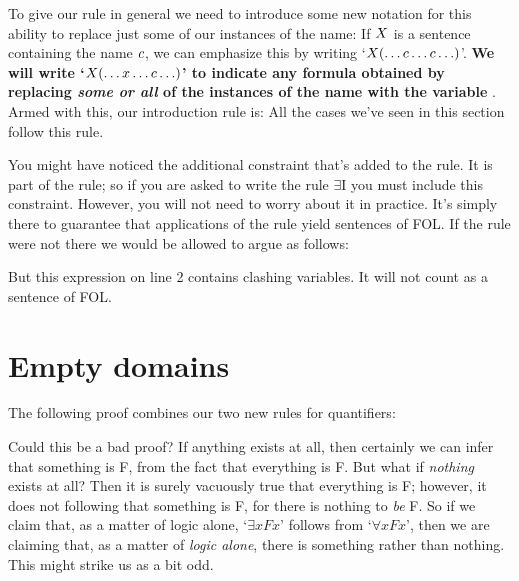 To give our rule in general we need to introduce some new notation for this ability to replace just some of our instances of the name: If $X$ is a sentence containing the name $c$, we can emphasize this by writing `$X(\ldots c \ldots c\ldots)$'. \textbf{We will write `$X(\ldots x \ldots c\ldots)$' to indicate any formula obtained by replacing \emph{some or all} of the instances of the name  with the variable }. Armed with this, our introduction rule is:
All the cases we've seen in this section follow this rule.

You might have noticed the additional constraint that's added to the rule. It is {part} of the rule; so if you are asked to write the rule $\exists$I  you {must} include this constraint. However, you will not need to worry about it in practice. It's simply there to guarantee that applications of the rule yield sentences of FOL. If the rule were not there we would be allowed to argue as follows:
\begin{fitchproof}
\end{fitchproof}But this expression on line 2 contains clashing variables. It will not count as a sentence of FOL.


\section{Empty domains}
The following proof combines our two new rules for quantifiers:
	\begin{fitchproof}
	\end{fitchproof}
Could this be a bad proof? If anything exists at all, then certainly we can infer that something is F, from the fact that everything is F. But what if \emph{nothing} exists at all? Then it is surely vacuously true that everything is F; however, it does not following that something is F, for there is nothing to \emph{be} F. So if we claim that, as a matter of logic alone, `$\exists x Fx$' follows from `$\forall x Fx$', then we are claiming that, as a matter of \emph{logic alone}, there is something rather than nothing. This might strike us as a bit odd.

